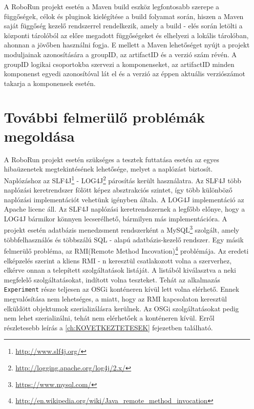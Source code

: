 	A RoboRun projekt esetén a Maven build eszköz legfontosabb szerepe a függőségek, célok és pluginok kielégítése a build folyamat során, hiszen a Maven saját függőség kezelő rendszerrel rendelkezik, amely  a build - elés során letölti a központi tárolóból az előre megadott függőségeket és elhelyezi a lokális tárolóban, ahonnan a jövőben használni fogja. E mellett a Maven lehetőséget nyújt a projekt moduljainak azonosítására a groupID, az artifactID és a verzió szám révén. A groupID logikai csoportokba szervezi a komponenseket, az artifactID minden komponenst egyedi azonosítóval lát el és a verzió az éppen aktuális verziószámot takarja a komponensek esetén.



\section{További felmerülő problémák megoldása}\label{sec:TovábbiProblemak}

	A RoboRun projekt esetén szükséges a tesztek futtatása esetén az egyes hibaüzenetek megtekintésének lehetősége, melyet a naplózást biztosít. Naplózáshoz az SLF4J\footnote{\href {http://www.slf4j.org/}{http://www.slf4j.org/}} - LOG4J\footnote{\href {http://logging.apache.org/log4j/2.x/}{http://logging.apache.org/log4j/2.x/}} párosítás került használatra. Az SLF4J több naplózási keretrendszer fölött képez absztrakciós szintet, így több különböző naplózási implementációt vehetünk igényben általa. A LOG4J implementáció az Apache licenc áll. Az SLF4J naplózási keretrendszernek a legfőbb előnye, hogy a LOG4J bármikor könnyen lecserélhető, bármilyen más implementációra. 
	A projekt esetén adatbázis menedzsment rendszerként a MySQL\footnote{\href {https://www.mysql.com/}{https://www.mysql.com/}} szolgált, amely többfelhasználós és többszálú SQL - alapú adatbázis-kezelő rendszer. 
	Egy másik felmerülő probléma, az RMI(Remote Method Incovation)\footnote{\href {http://en.wikipedia.org/wiki/Java\_remote\_method\_invocation}{http://en.wikipedia.org/wiki/Java\_remote\_method\_invocation}} problémája. Az eredeti elképzelés szerint a kliens RMI - n keresztül csatlakozott volna a szerverhez, elkérve onnan a telepített szolgáltatások listáját. A listából kiválasztva a neki megfelelő szolgáltatásokat, indított volna teszteket. Tehát az alkalmazás \texttt{Experiment} része teljesen az OSGi konténeren kívül lett volna elérhető. Ennek megvalósítása nem lehetséges, a miatt, hogy az RMI kapcsolaton keresztül elküldött objektumok szerializálásra kerülnek. Az OSGi szolgáltatásokat pedig nem lehet szerializálni, tehát nem elérhetőek a konténeren kívül. Erről részletesebb leírás a \ref{ch:KOVETKEZTETESEK} fejezetben található.
	
	